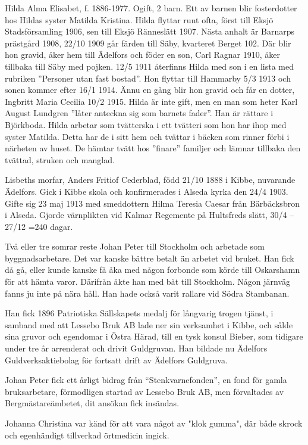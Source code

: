 Hilda Alma Elisabet, f. 1886-1977. Ogift, 2 barn. Ett av barnen blir fosterdotter hos Hildas syster Matilda Kristina. Hilda flyttar runt ofta, först till Eksjö Stadsförsamling 1906, sen till Eksjö Ränneslätt 1907. Nästa anhalt är Barnarps prästgård 1908,  22/10 1909 går färden till Säby, kvarteret Berget 102. Där blir hon gravid, åker hem till Ädelfors och föder en son, Carl Ragnar 1910, åker tillbaka till Säby med pojken. 12/5 1911 återfinns Hilda med son i en lista med rubriken
”Personer utan fast bostad”. Hon  flyttar till Hammarby 5/3 1913 och sonen kommer efter 16/1 1914. Ännu en gång blir hon gravid  och får en dotter, Ingbritt Maria Cecilia 10/2 1915. Hilda är inte gift, men en man som heter Karl August Lundgren ”låter anteckna sig som barnets fader”. Han är rättare i Björkboda.
Hilda arbetar som tvätterska i ett tvätteri som hon har ihop med syster Matilda. Detta har de i sitt hem och tvättar i bäcken som rinner förbi i närheten av huset. De hämtar tvätt hos ”finare” familjer och lämnar tillbaka den tvättad, struken och manglad.


Lisbeths morfar, Anders Fritiof Cederblad, född 21/10 1888 i Kibbe, nuvarande Ädelfors. Gick i Kibbe skola och konfirmerades i Alseda kyrka den 24/4 1903. Gifte sig 23 maj 1913 med smeddottern Hilma Teresia Caesar från Bärbäcksbron i Alseda.
Gjorde värnplikten vid Kalmar Regemente på Hultsfreds slätt, 30/4 – 27/12 =240 dagar.


Två eller tre somrar reste Johan Peter till Stockholm och arbetade som byggnadsarbetare.
Det var kanske bättre betalt än arbetet vid bruket. Han fick då gå, eller kunde kanske få åka med någon forbonde som körde till Oskarshamn för att hämta varor. Därifrån åkte han med båt till Stockholm. Någon järnväg fanns ju inte på nära håll. Han hade också varit rallare vid Södra Stambanan.


Han fick 1896 Patriotiska Sällskapets medalj för långvarig trogen tjänst, i samband med att Lessebo Bruk AB lade ner sin verksamhet i Kibbe, och sålde sina gruvor och egendomar i Östra Härad, till en tysk konsul Bieber, som tidigare under tre år arrenderat och drivit Guldgruvan. Han bildade nu Ädelfors Guldverksaktiebolag för fortsatt drift av Ädelfors Guldgruva.


Johan Peter fick ett årligt bidrag från ``Stenkvarnefonden'', en fond för gamla bruksarbetare, förmodligen startad av Lessebo Bruk AB, men förvaltades av Bergmästareämbetet, dit ansökan fick insändas.




Johanna Christina var känd för att vara något av "klok gumma", där både skrock och egenhändigt tillverkad örtmedicin ingick.


